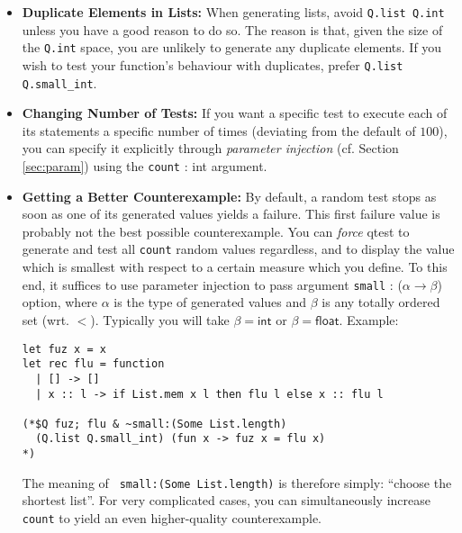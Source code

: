 \begin{itemize}
\item \textbf{Duplicate Elements in Lists:}
When generating lists, avoid \texttt{Q.list Q.int} unless you have a good reason to do so.
The reason is that, given the size of the \texttt{Q.int} space, you are unlikely
to generate any duplicate elements. If you wish to test your function's behaviour with
duplicates, prefer \texttt{Q.list Q.small\_int}.

\item \textbf{Changing Number of Tests:}
If you want a specific test to execute each of its statements a specific number of times
(deviating from the default of $100$), you can specify it explicitly through
\emph{parameter injection} (cf. Section \ref{sec:param}) using the
\texttt{count} : \textsf{int} argument.

\item \textbf{Getting a Better Counterexample:}
By default, a random test stops as soon as one of its generated values
yields a failure. This first failure value is probably not the best possible
counterexample. You can \emph{force} qtest to generate and test all \texttt{count}
random values regardless, and to display the value which is smallest with respect
to a certain measure which you define. To this end, it suffices to use parameter injection
to pass argument \texttt{small} : ($\alpha \to \beta$) \textsf{option},
where $\alpha$ is the type of
generated values and $\beta$ is any totally ordered set (wrt. $<$). Typically
you will take $\beta = \textsf{int}$ or $\beta = \textsf{float}$. Example:
\begin{verbatim}
let fuz x = x
let rec flu = function
  | [] -> []
  | x :: l -> if List.mem x l then flu l else x :: flu l

(*$Q fuz; flu & ~small:(Some List.length)
  (Q.list Q.small_int) (fun x -> fuz x = flu x)
*)
\end{verbatim}
The meaning of \texttt{~small:(Some List.length)} is therefore simply:
``choose the shortest list''. For very complicated cases, you can simultaneously
increase \texttt{count} to yield an even higher-quality counterexample.

\end{itemize}



